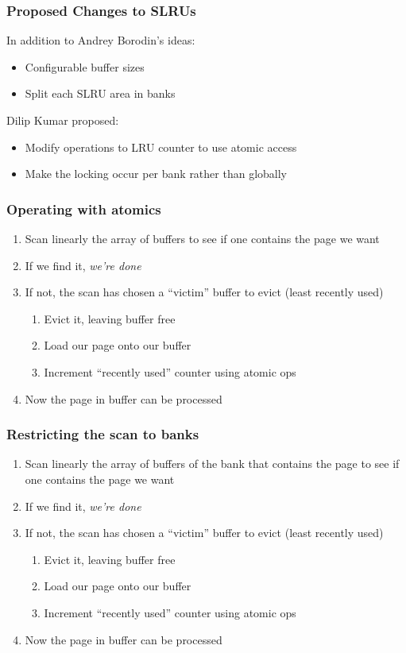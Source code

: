 \begin{frame}
  \frametitle{Proposed Changes to SLRUs}
  In addition to Andrey Borodin's ideas:
  \begin{itemize}
    \item Configurable buffer sizes
    \item Split each SLRU area in banks
  \end{itemize}

  Dilip Kumar proposed:
  \begin{itemize}
    \item Modify operations to LRU counter to use atomic access
    \item Make the locking occur per bank rather than globally
  \end{itemize}
\end{frame}

\begin{frame}
  \frametitle{Operating with atomics}
  \begin{enumerate}
    \item Scan linearly the array of buffers to see if one contains the page we want
    \item If we find it, \emph{we're done}
    \item If not, the scan has chosen a ``victim'' buffer to evict (least recently used)
      \begin{enumerate}
	\item Evict it, leaving buffer free
	\item Load our page onto our buffer
	\item \alert{Increment ``recently used'' counter using atomic ops}
      \end{enumerate}
    \item Now the page in buffer can be processed 
  \end{enumerate}
\end{frame}

\begin{frame}
  \frametitle{Restricting the scan to banks}
  \begin{enumerate}
    \item Scan linearly the array of buffers \alert{of the bank that contains the page} to see if one contains the page we want
    \item If we find it, \emph{we're done}
    \item If not, the scan has chosen a ``victim'' buffer to evict (least recently used)
      \begin{enumerate}
	\item Evict it, leaving buffer free
	\item Load our page onto our buffer
	\item Increment ``recently used'' counter using atomic ops
      \end{enumerate}
    \item Now the page in buffer can be processed 
  \end{enumerate}
\end{frame}

